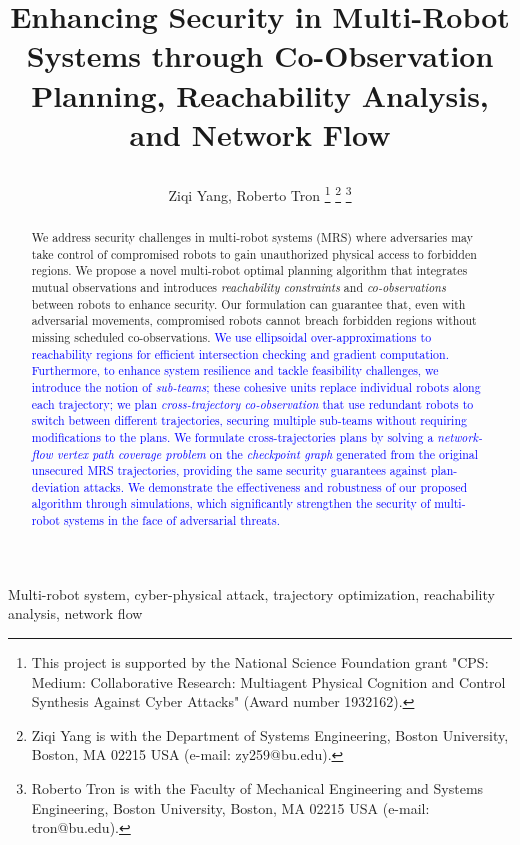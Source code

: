\documentclass[10pt,twocolumn,twoside]{IEEEtran}
\title{\LARGE \bf

Enhancing Security in Multi-Robot Systems through Co-Observation Planning, Reachability Analysis, and Network Flow}
\author{Ziqi Yang, Roberto Tron \IEEEmembership{Member, IEEE} 
\thanks{This project is supported by the National Science Foundation grant "CPS: Medium: Collaborative Research: Multiagent Physical Cognition and Control Synthesis Against Cyber Attacks" (Award number 1932162).}
\thanks{Ziqi Yang is with the Department of Systems Engineering,
Boston University, Boston, MA 02215 USA (e-mail: zy259@bu.edu).
}
\thanks{Roberto Tron is with the Faculty of Mechanical Engineering and Systems Engineering, Boston University, Boston, MA 02215 USA (e-mail:
tron@bu.edu).}}
\newcommand{\new}[1]{\textcolor{blue}{#1}}
\newcommand{\news}{\color{blue}}
\begin{document}
\maketitle
\thispagestyle{empty}
\pagestyle{empty}




\begin{abstract}
We address security challenges in multi-robot systems (MRS) where adversaries may take control of compromised robots to gain unauthorized physical access to forbidden regions. We propose a novel multi-robot optimal planning algorithm that integrates mutual observations and introduces {\news \emph{reachability constraints} and \emph{co-observations} between robots to enhance security}. Our formulation can guarantee that, even with adversarial movements, compromised robots cannot breach forbidden regions without missing scheduled co-observations. \new{We use ellipsoidal over-approximations to reachability regions for efficient intersection checking and gradient computation. Furthermore, to enhance system resilience and tackle feasibility challenges, we introduce the notion of \emph{sub-teams}; these cohesive units replace individual robots along each trajectory; we plan \emph{cross-trajectory co-observation} that use redundant robots to switch between different trajectories, securing multiple sub-teams without requiring modifications to the plans. We formulate cross-trajectories plans by solving a \emph{network-flow vertex path coverage problem} on the \emph{checkpoint graph} generated from the original unsecured MRS trajectories, providing the same security guarantees against plan-deviation attacks. We demonstrate the effectiveness and robustness of our proposed algorithm through simulations, which significantly strengthen the security of multi-robot systems in the face of adversarial threats.}
\end{abstract}
\begin{IEEEkeywords}
  Multi-robot system, cyber-physical attack, trajectory optimization, reachability analysis, network flow
\end{IEEEkeywords}
\end{document}
